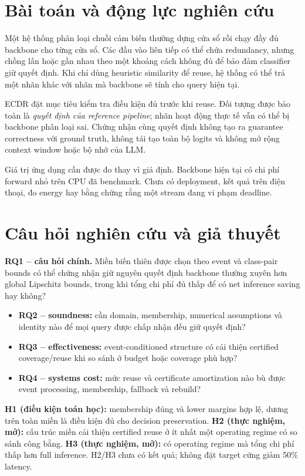 \documentclass[11pt,a4paper]{article}
\begin{document}
\section{Bài toán và động lực nghiên cứu}
Một hệ thống phân loại chuỗi cảm biến thường dựng cửa sổ rồi chạy đầy đủ
backbone cho từng cửa sổ. Các đầu vào liên tiếp có thể chứa redundancy, nhưng
chồng lấn hoặc gần nhau theo một khoảng cách không đủ để bảo đảm classifier
giữ quyết định. Khi chỉ dùng heuristic similarity để reuse, hệ thống có thể
trả một nhãn khác với nhãn mà backbone sẽ tính cho query hiện tại.

ECDR đặt mục tiêu kiểm tra điều kiện đủ trước khi reuse. Đối tượng được bảo
toàn là \emph{quyết định của reference pipeline}; nhãn hoạt động thực tế vẫn
có thể bị backbone phân loại sai. Chứng nhận cùng quyết định không tạo ra
guarantee correctness với ground truth, không tái tạo toàn bộ logits và
không mở rộng context window hoặc bộ nhớ của LLM.

Giá trị ứng dụng cần được đo thay vì giả định. Backbone hiện tại có chi phí
forward nhỏ trên CPU đã benchmark. Chưa có deployment, kết quả trên điện
thoại, đo energy hay bằng chứng rằng một stream đang vi phạm deadline.

\section{Câu hỏi nghiên cứu và giả thuyết}
\textbf{RQ1 -- câu hỏi chính.}
Miền biến thiên được chọn theo event và class-pair bounds có thể chứng nhận
giữ nguyên quyết định backbone thường xuyên hơn global Lipschitz bounds,
trong khi tổng chi phí đủ thấp để có net inference saving hay không?

\begin{itemize}
\item \textbf{RQ2 -- soundness:} cần domain, membership, numerical assumptions
và identity nào để mọi query được chấp nhận đều giữ quyết định?
\item \textbf{RQ3 -- effectiveness:} event-conditioned structure có cải thiện
certified coverage/reuse khi so sánh ở budget hoặc coverage phù hợp?
\item \textbf{RQ4 -- systems cost:} mức reuse và certificate amortization nào
bù được event processing, membership, fallback và rebuild?
\end{itemize}

\textbf{H1 (điều kiện toán học):} membership đúng và lower margins hợp lệ,
dương trên toàn miền là điều kiện đủ cho decision preservation.
\textbf{H2 (thực nghiệm, mở):} cấu trúc miền cải thiện certified reuse ở ít
nhất một operating regime có so sánh công bằng.
\textbf{H3 (thực nghiệm, mở):} có operating regime mà tổng chi phí thấp hơn
full inference. H2/H3 chưa có kết quả; không đặt target cứng giảm 50\% latency.
\end{document}
